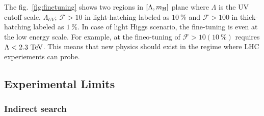 The fig.~\ref{fig:finetuning} \cite{Kolda:2000wi} shows two regions in $[\Lambda,m_{\mathrm{H}}]$ plane
where $\Lambda$ is the UV cutoff scale, $\Lambda_{UV}$; 
$\mathcal{F}>10$ in light-hatching labeled as $10~\%$ 
and $\mathcal{F}>100$ in thick-hatching labeled as $1~\%$.  
In case of light Higgs scenario, the fine-tuning is even at the low energy scale. 
For example, at  \GeV{} the fineo-tuning of $\mathcal{F}>10(10~\%)$ requires 
$\Lambda<2.3~\mathrm{Te\kern -0.1em V}$. This means that new physics should exist in the regime where 
LHC experiements can probe.

\newpage
\subsection{Experimental Limits} 

%
\subsubsection{Indirect search} 

